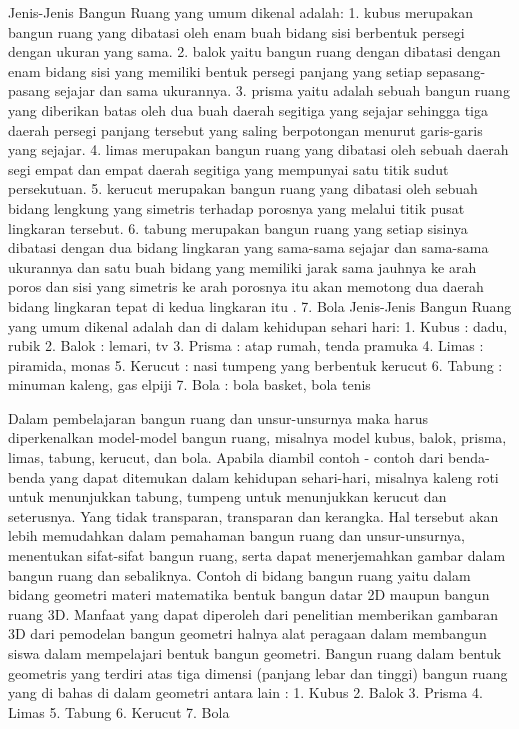 Jenis-Jenis Bangun Ruang yang umum dikenal adalah:
1. kubus merupakan bangun ruang yang dibatasi oleh enam buah bidang sisi berbentuk persegi dengan ukuran yang sama.
2. balok yaitu bangun ruang dengan dibatasi dengan enam bidang sisi yang memiliki bentuk persegi panjang yang setiap sepasang-pasang sejajar dan sama ukurannya.
3. prisma yaitu adalah sebuah bangun ruang yang diberikan batas oleh dua buah daerah segitiga yang sejajar sehingga tiga daerah persegi panjang tersebut yang saling berpotongan menurut garis-garis yang sejajar.
4. limas merupakan bangun ruang yang dibatasi oleh sebuah daerah segi empat dan empat daerah segitiga yang mempunyai satu titik sudut persekutuan.
5. kerucut merupakan bangun ruang yang dibatasi oleh sebuah bidang lengkung yang simetris terhadap porosnya yang melalui titik pusat lingkaran tersebut.
6. tabung merupakan bangun ruang yang setiap sisinya dibatasi dengan dua bidang lingkaran yang sama-sama sejajar dan sama-sama ukurannya dan satu buah bidang 
     yang memiliki jarak sama jauhnya ke arah poros dan sisi yang simetris ke arah porosnya itu akan memotong dua daerah bidang lingkaran tepat di kedua lingkaran itu .
7. Bola
Jenis-Jenis Bangun Ruang yang umum dikenal adalah dan di dalam kehidupan sehari hari:
1.   Kubus    : dadu, rubik
2.   Balok    : lemari, tv
3.   Prisma   : atap rumah, tenda pramuka
4.   Limas    : piramida, monas
5.   Kerucut  : nasi tumpeng yang berbentuk kerucut
6.   Tabung   : minuman kaleng, gas elpiji
7.   Bola     : bola basket, bola tenis

Dalam pembelajaran bangun ruang dan unsur-unsurnya maka harus diperkenalkan model-model bangun ruang, misalnya model kubus, balok, prisma, limas, tabung, kerucut, dan bola. Apabila diambil contoh - contoh dari benda-benda yang dapat ditemukan dalam kehidupan sehari-hari, misalnya kaleng roti untuk menunjukkan tabung, tumpeng untuk menunjukkan kerucut dan seterusnya. Yang tidak transparan, transparan dan kerangka. Hal tersebut akan lebih memudahkan dalam pemahaman bangun ruang dan unsur-unsurnya, menentukan sifat-sifat bangun ruang, serta dapat menerjemahkan gambar dalam bangun ruang dan sebaliknya.
Contoh di bidang bangun ruang yaitu dalam bidang geometri  materi matematika bentuk bangun datar 2D maupun bangun ruang 3D. 
Manfaat yang dapat diperoleh dari penelitian memberikan gambaran 3D dari pemodelan bangun geometri halnya alat peragaan dalam membangun siswa dalam mempelajari bentuk bangun geometri.
Bangun ruang dalam bentuk geometris yang terdiri atas tiga dimensi (panjang lebar dan tinggi) bangun ruang yang di bahas di dalam geometri antara lain :
1.    Kubus
2.    Balok 
3.    Prisma
4.    Limas
5.    Tabung
6.    Kerucut
7.    Bola

